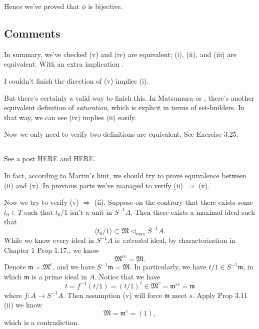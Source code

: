 Hence we've proved that $\phi$ is bijective. 

\subsection{Comments}

In summary, we've checked (v) and (iv) are equivalent; (i), (ii), and (iii) are equivalent. With an extra implication . 

I couldn't finish the direction of (v) implies (i). 

But there's certainly a valid way to finish this. In Matsumura \cite{matsumura1989commutative} or \cite{altman}, there's another equivalent definition of \textit{saturation}, which is explicit in terms of set-builders. In that way, we can see (iv) implies (ii) easily. 

Now we only need to verify two definitions are equivalent. See \cite{altman} Exercise 3.25.

\subsection{}

See a post \href{http://math_research.uct.ac.za/marques/US/AMCh3forSophiesAGSeminar.pdf}{HERE} and \href{https://math.stackexchange.com/questions/308292/s-t-be-multiplicatively-closed-sets-in-the-ring-r-such-that-s-subseteq-t}{HERE}.

In fact, according to Martin's hint, we should try to prove equivalence between (ii) and (v). In previous parts we've managed to verify (ii) $\Rightarrow$ (v).

Now we try to verify (v) $\Rightarrow$ (ii). Suppose on the contrary that there exists some $t_0\in T$ such that $t_0/1$ isn't a unit in $S^{-1}A$. Then there exists a maximal ideal such that \[\langle t_0/1\rangle \subset \mathfrak M \triangleleft_{\text{max}}S^{-1}A.\] While we know every ideal in $S^{-1}A$ is \textit{extended} ideal, by characterisation in Chapter 1 Prop 1.17., we know \[\mathfrak M^{ce}=\mathfrak M.\] Denote $\mathfrak m=\mathfrak M^c$, and we have $S^{-1}\mathfrak m=\mathfrak M$. In particularly, we have $t/1\in S^{-1}\mathfrak m$, in which $\mathfrak m$ is a prime ideal in $A$. 
Notice that we have 
\[t=f^{-1}(t/1)=(t/1)^c\in\mathfrak M^c=\mathfrak m^{ec}=\mathfrak m\] where $f:A\to S^{-1}A$.
Then assumption (v) will force $\mathfrak m$ meet $s$. Apply Prop 3.11 (ii) we know 
\[\mathfrak M=\mathfrak m^e=(1),\] which is a contradiction.

